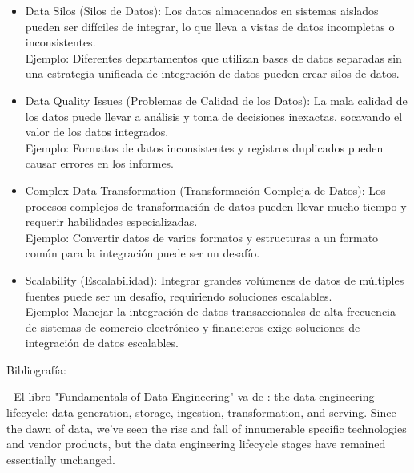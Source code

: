 \documentclass[12pt]{book}
\begin{document}
\begin{itemize}
    \item Data Silos (Silos de Datos): Los datos almacenados en sistemas aislados pueden ser difíciles de integrar, lo que lleva a vistas de datos incompletas o inconsistentes.\\
    Ejemplo: Diferentes departamentos que utilizan bases de datos separadas sin una estrategia unificada de integración de datos pueden crear silos de datos. 
    \item Data Quality Issues (Problemas de Calidad de los Datos): La mala calidad de los datos puede llevar a análisis y toma de decisiones inexactas, socavando el valor de los datos integrados.\\
    Ejemplo: Formatos de datos inconsistentes y registros duplicados pueden causar errores en los informes.
    \item Complex Data Transformation (Transformación Compleja de Datos): Los procesos complejos de transformación de datos pueden llevar mucho tiempo y requerir habilidades especializadas.\\
    Ejemplo: Convertir datos de varios formatos y estructuras a un formato común para la integración puede ser un desafío.
    \item Scalability (Escalabilidad): Integrar grandes volúmenes de datos de múltiples fuentes puede ser un desafío, requiriendo soluciones escalables.\\
    Ejemplo: Manejar la integración de datos transaccionales de alta frecuencia de sistemas de comercio electrónico y financieros exige soluciones de integración de datos escalables.
\end{itemize}



Bibliografía: 

- El libro "Fundamentals of Data Engineering" va de : the data engineering lifecycle: data generation, storage, ingestion, transformation, and serving. Since the dawn of data, we've seen the rise and fall of innumerable specific technologies and vendor products, but the data engineering lifecycle stages have remained essentially unchanged. 
\end{document}
